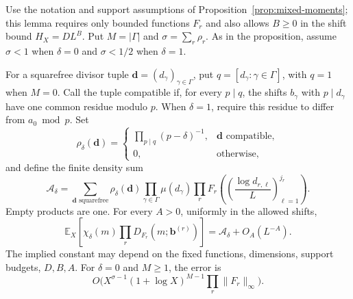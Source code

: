 \begin{lemma}\label{lem:arithmetic-2}

Use the notation and support assumptions of
Proposition~\ref{prop:mixed-moments}; this lemma requires only bounded
functions $F_r$ and also allows $B\ge0$ in the shift bound
$H_X=DL^B$. Put $M=|\Gamma|$ and $\sigma=\sum_r\rho_r$.
As in the proposition, assume $\sigma<1$ when $\delta=0$ and
$\sigma<1/2$ when $\delta=1$.

For a squarefree divisor tuple $\mathbf d=(d_\gamma)_{\gamma\in\Gamma}$,
put $q=[d_\gamma:\gamma\in\Gamma]$, with $q=1$ when $M=0$.
Call the tuple compatible if, for every $p\mid q$, the shifts
$b_\gamma$ with $p\mid d_\gamma$ have one common residue modulo $p$.
When $\delta=1$, require this residue to differ from $a_0\bmod p$.
Set
\[
 \rho_\delta(\mathbf d)=
 \begin{cases}
  \displaystyle\prod_{p\mid q}(p-\delta)^{-1},
       &\mathbf d\text{ compatible},\\
  0,&\text{otherwise},
 \end{cases}
\]
and define the finite density sum
\begin{equation}
 \mathcal A_\delta=
 \sum_{\mathbf d\text{ squarefree}}
 \rho_\delta(\mathbf d)\prod_{\gamma\in\Gamma}\mu(d_\gamma)
 \prod_rF_r\left(
       \left(\frac{\log d_{r,\ell}}L\right)_{\ell=1}^{j_r}\right).
\label{eq:arithmetic-5}
\end{equation}
Empty products are one. For every $A>0$, uniformly in the allowed shifts,
\begin{equation}
 \mathbb E_X\left[\chi_\delta(m)
             \prod_rD_{F_r}(m;\mathbf b^{(r)})\right]
 =\mathcal A_\delta+O_A(L^{-A}).
\label{eq:arithmetic-6}
\end{equation}
The implied constant may depend on the fixed functions, dimensions,
support budgets, $D,B,A$. For $\delta=0$ and $M\ge1$, the error is
\begin{equation}
 O\bigl(X^{\sigma-1}(1+\log X)^{M-1}
          \prod_r\|F_r\|_\infty\bigr).
\label{eq:arithmetic-7}
\end{equation}

\end{lemma}
